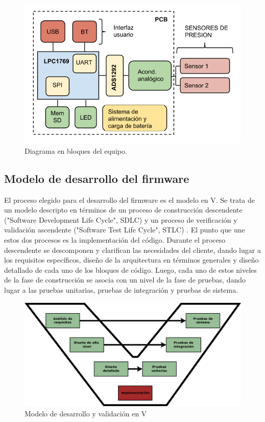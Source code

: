 \begin{figure}[!htbp]
	\centering
	\includegraphics[width=\textwidth]{./Figures/diag_bloques.png}
	\caption{Diagrama en bloques del equipo.}
	\label{fig:diag_bloques}
\end{figure}

\subsection{Modelo de desarrollo del firmware}


El proceso elegido para el desarrollo del firmware es el modelo en V. Se trata de un modelo descripto en términos de un proceso de construcción descendente ("Software Development Life Cycle", SDLC) y un proceso de verificación y validación ascendente ("Software Test Life Cycle", STLC) \citep{fowler2015}. El punto que une estos dos procesos es la implementación del código. 
Durante el proceso descendente se descomponen y clarifican las necesidades del cliente, dando lugar a los requisitos específicos, diseño de la arquitectura en términos generales y diseño detallado de cada uno de los bloques de código. Luego, cada uno de estos niveles de la fase de construcción se asocia con un nivel de la fase de pruebas, dando lugar a las pruebas unitarias, pruebas de integración y pruebas de sistema.

\begin{figure}[!htbp]
	\centering
	\includegraphics[width=\textwidth]{./Figures/modeloV.png}
	\caption{Modelo de desarrollo y validación en V}
	\label{fig:modeloV}
\end{figure}

